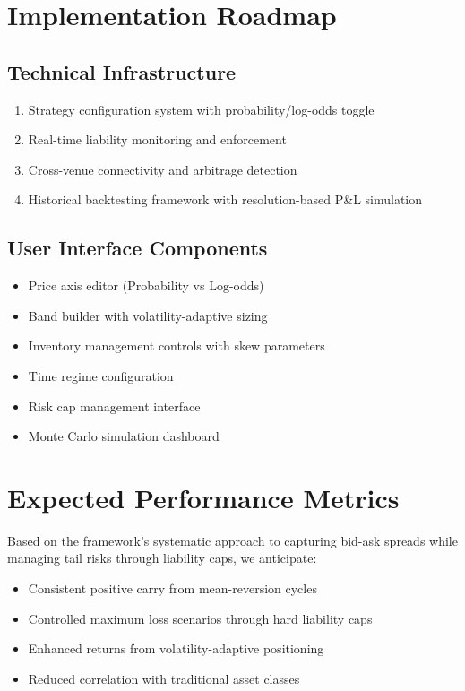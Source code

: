 \documentclass[11pt]{article}
\begin{document}
\section{Implementation Roadmap}

\subsection{Technical Infrastructure}
\begin{enumerate}
    \item Strategy configuration system with probability/log-odds toggle
    \item Real-time liability monitoring and enforcement
    \item Cross-venue connectivity and arbitrage detection
    \item Historical backtesting framework with resolution-based P\&L simulation
\end{enumerate}

\subsection{User Interface Components}
\begin{itemize}
    \item Price axis editor (Probability vs Log-odds)
    \item Band builder with volatility-adaptive sizing
    \item Inventory management controls with skew parameters
    \item Time regime configuration
    \item Risk cap management interface
    \item Monte Carlo simulation dashboard
\end{itemize}

\section{Expected Performance Metrics}

Based on the framework's systematic approach to capturing bid-ask spreads while managing tail risks through liability caps, we anticipate:

\begin{itemize}
    \item Consistent positive carry from mean-reversion cycles
    \item Controlled maximum loss scenarios through hard liability caps
    \item Enhanced returns from volatility-adaptive positioning
    \item Reduced correlation with traditional asset classes
\end{itemize}
\end{document}
